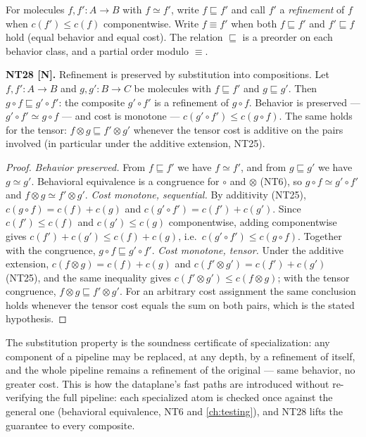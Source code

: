 \begin{definition}[Refinement]\label{def:refine}
For molecules $f, f' \colon A \to B$ with $f \simeq f'$, write
$f \sqsubseteq f'$ and call $f'$ a \emph{refinement} of $f$ when
$c(f') \le c(f)$ componentwise. Write $f \equiv f'$ when both
$f \sqsubseteq f'$ and $f' \sqsubseteq f$ hold (equal behavior and equal
cost). The relation $\sqsubseteq$ is a preorder on each behavior class, and a
partial order modulo $\equiv$.
\end{definition}

\begin{theorem}\label{nt:28}
\textbf{NT28 [N].} Refinement is preserved by substitution into compositions.
Let $f, f' \colon A \to B$ and $g, g' \colon B \to C$ be molecules with
$f \sqsubseteq f'$ and $g \sqsubseteq g'$. Then $g \circ f \sqsubseteq
g' \circ f'$: the composite $g' \circ f'$ is a refinement of $g \circ f$.
Behavior is preserved --- $g' \circ f' \simeq g \circ f$ --- and cost is
monotone --- $c(g' \circ f') \le c(g \circ f)$. The same holds for the tensor:
$f \otimes g \sqsubseteq f' \otimes g'$ whenever the tensor cost is additive on
the pairs involved (in particular under the additive extension, NT25).
\end{theorem}

\begin{proof}
\emph{Behavior preserved.} From $f \sqsubseteq f'$ we have $f \simeq f'$, and
from $g \sqsubseteq g'$ we have $g \simeq g'$. Behavioral equivalence is a
congruence for $\circ$ and $\otimes$ (NT6), so $g \circ f \simeq g' \circ f'$
and $f \otimes g \simeq f' \otimes g'$.
\emph{Cost monotone, sequential.} By additivity (NT25),
$c(g \circ f) = c(f) + c(g)$ and $c(g' \circ f') = c(f') + c(g')$. Since
$c(f') \le c(f)$ and $c(g') \le c(g)$ componentwise, adding componentwise
gives $c(f') + c(g') \le c(f) + c(g)$, i.e.\ $c(g' \circ f') \le
c(g \circ f)$. Together with the congruence, $g \circ f \sqsubseteq
g' \circ f'$.
\emph{Cost monotone, tensor.} Under the additive extension,
$c(f \otimes g) = c(f) + c(g)$ and $c(f' \otimes g') = c(f') + c(g')$ (NT25),
and the same inequality gives $c(f' \otimes g') \le c(f \otimes g)$; with the
tensor congruence, $f \otimes g \sqsubseteq f' \otimes g'$. For an arbitrary
cost assignment the same conclusion holds whenever the tensor cost equals the
sum on both pairs, which is the stated hypothesis.
\end{proof}

\begin{remark}
The substitution property is the soundness certificate of specialization: any
component of a pipeline may be replaced, at any depth, by a refinement of
itself, and the whole pipeline remains a refinement of the original --- same
behavior, no greater cost. This is how the dataplane's fast paths are
introduced without re-verifying the full pipeline: each specialized atom is
checked once against the general one (behavioral equivalence, NT6 and
\autoref{ch:testing}), and NT28 lifts the guarantee to every composite.
\end{remark}

